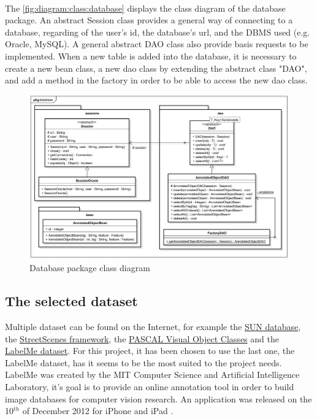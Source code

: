~~


The \vref{fig:diagram:class:database} displays the class diagram of the database package. An abstract Session class provides a general way of connecting to a database, regarding of the user's id, the database's url, and the \gls{DBMS} used (e.g. Oracle, MySQL). A general abstract DAO class also provide basis requests to be implemented. When a new table is added into the database, it is necessary to create a new bean class, a new dao class by extending the abstract class "DAO", and add a method in the factory in order to be able to access the new dao class.


\begin{figure}[hb]
	\centering 
	\includegraphics[width=1\textwidth]{images/diagrams/class_diagram_database}
	\caption{Database package class diagram}
	\label{fig:diagram:class:database}
\end{figure}


\subsection{The selected dataset}

Multiple dataset can be found on the Internet, for example the \href{http://groups.csail.mit.edu/vision/SUN/}{SUN database}, the \href{http://cbcl.mit.edu/software-datasets/streetscenes/}{StreetScenes framework}, the \href{http://host.robots.ox.ac.uk/pascal/VOC/voc2007/index.html}{PASCAL Visual Object Classes} and the \href{http://labelme2.csail.mit.edu/Release3.0/browserTools/php/dataset.php}{LabelMe dataset}. For this project, it has been chosen to use the last one, the LabelMe dataset, has it seems to be the most suited to the project needs. LabelMe was created by the MIT Computer Science and Artificial Intelligence Laboratory, it's goal is to provide an online annotation tool in order to build image databases for computer vision research. An application was released on the 10$^{th}$ of December 2012 for iPhone and iPad \cite{bib:labelme}.

